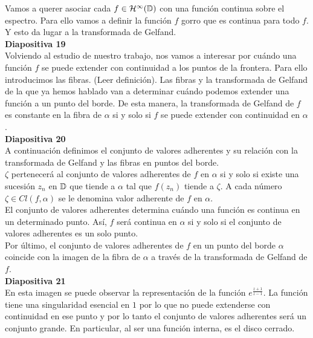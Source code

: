 \documentclass[spanish, a4paper, 12pt]{article}
\begin{document}
Vamos a querer asociar cada $f \in \mathcal{H}^{\infty}(\mathbb{D})$ con una función continua sobre el espectro. Para ello vamos a definir la función $f$ gorro que es continua para todo $f$. Y esto da lugar a la transformada de Gelfand. \\

\textbf{Diapositiva 19} \\

Volviendo al estudio de nuestro trabajo, nos vamos a interesar por cuándo una función $f$ se puede extender con continuidad a los puntos de la frontera. Para ello introducimos las fibras. (Leer definición). Las fibras y la transformada de Gelfand de la que ya hemos hablado van a determinar cuándo podemos extender una función a un punto del borde. De esta manera, la transformada de Gelfand de $f$ es constante en la fibra de $\alpha$ si y solo si $f$ se puede extender con continuidad en $\alpha$. \\

\textbf{Diapositiva 20} \\

A continuación definimos el conjunto de valores adherentes y su relación con la transformada de Gelfand y las fibras en puntos del borde. \\

$\zeta$ pertenecerá al conjunto de valores adherentes de $f$ en $\alpha$ si y solo si existe una sucesión $z_n$ en $\mathbb{D}$ que tiende a $\alpha$ tal que $f(z_n)$ tiende a $\zeta$. A cada número $\zeta \in Cl(f, \alpha)$ se le denomina valor adherente de $f$ en $\alpha$. \\

El conjunto de valores adherentes determina cuándo una función es continua en un determinado punto. Así, $f$ será continua en $\alpha$ si y solo si el conjunto de valores adherentes es un solo punto. \\

Por último, el conjunto de valores adherentes de $f$ en un punto
del borde $\alpha$ coincide con la imagen de la fibra de $\alpha$ a través de la transformada de Gelfand de $f$. \\

\textbf{Diapositiva 21} \\

En esta imagen se puede observar la representación de la función $e^{\frac{z+1}{z-1}}$. La función tiene una singularidad esencial en $1$ por lo que no puede extenderse con continuidad en ese punto y por lo tanto el conjunto de valores adherentes será un conjunto grande. En particular, al ser una función interna, es el disco cerrado. \\
\end{document}
